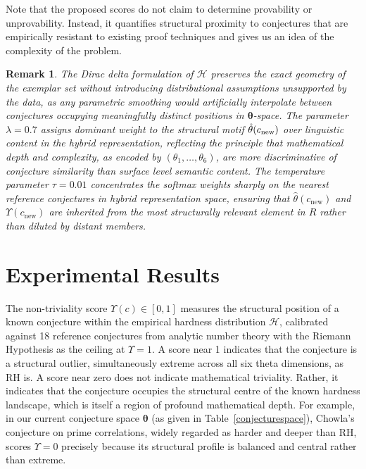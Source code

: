 \documentclass[11pt,reqno]{amsart}
\theoremstyle{plain}\newtheorem{theorem}{Theorem}[section]
\newtheorem{remark}{Remark}[section]
\numberwithin{equation}{section}
\begin{document}
\medskip
Note that the proposed scores do not claim to determine provability or unprovability. Instead, it quantifies structural proximity to conjectures that are empirically resistant to existing proof techniques and gives us an idea of the complexity of the problem. 

\begin{remark}
The Dirac delta formulation of $\mathcal{H}$ preserves the exact geometry of the exemplar set without introducing distributional assumptions unsupported by the data, as any parametric smoothing would artificially interpolate between conjectures occupying meaningfully distinct positions in ${\bm{\theta}}$-space. The parameter $\lambda=0.7$ assigns dominant weight to the structural motif $\Hat{\theta}(c_{\mathrm{new}})$ over linguistic content in the hybrid representation, reflecting the principle that mathematical depth and complexity, as encoded by $(\theta_1,\ldots,\theta_6)$, are more discriminative of conjecture similarity than surface level semantic content. The temperature parameter $\tau=0.01$ concentrates the softmax weights sharply on the nearest reference conjectures in hybrid representation space, ensuring that $\hat{\theta}(c_{\mathrm{new}})$ and $\Upsilon(c_{\mathrm{new}})$ are inherited from the most structurally relevant element in $R$ rather than diluted by distant members.    
\end{remark}



\section{Experimental Results}
\noindent
The non-triviality score $\Upsilon(c)\in[0,1]$ measures the structural position of a known conjecture within the empirical hardness distribution $\mathcal{H}$, calibrated against 18 reference conjectures from analytic number theory with the Riemann Hypothesis as the ceiling at $\Upsilon=1$. A score near 1 indicates that the conjecture is a structural outlier, simultaneously extreme across all six theta dimensions, as RH is. A score near zero does not indicate mathematical triviality. Rather, it indicates that the conjecture occupies the structural centre of the known hardness landscape, which is itself a region of profound mathematical depth. For example, in our current conjecture space ${\bm{\theta}}$ (as given in Table~\ref{conjecturespace}), Chowla's conjecture on prime correlations, widely regarded as harder and deeper than RH, scores $\Upsilon=0$ precisely because its structural profile is balanced and central rather than extreme. 
\end{document}
